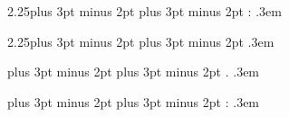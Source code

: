 {2.25\baselineskip plus 3pt minus 2pt}		%
{\baselineskip plus 3pt minus 2pt}		%
{\itshape}					%
{}						%
{\bfseries}					%
{:}						%
{.3em}						%
{\,}	%

{2.25\baselineskip plus 3pt minus 2pt}		%
{\baselineskip plus 3pt minus 2pt}		%
{\itshape}					%
{}						%
{\bfseries}					%
{}						%
{.3em}						%
{\,{\itshape{}}}	%

{\baselineskip plus 3pt minus 2pt}		%
{\baselineskip plus 3pt minus 2pt}		%
{}						%
{}						%
{\bfseries\itshape}				%
{.}						%
{.3em}						%
{}						%

{\baselineskip plus 3pt minus 2pt}		%
{\baselineskip plus 3pt minus 2pt}		%
{\itshape}					%
{}						%
{\bfseries}					%
{:}						%
{.3em}						%
{}						%

\theoremstyle{number-name}
  \newtheorem{lemma}{\color{lmm}Lema}[section]
  \newtheorem{theorem}{\color{thm}Teorema}[section]
  \newtheorem{proposition}{\color{prop}Proposição}[section]
  \newtheorem{corollary}{\color{crl}Corolário}[section]
  \newtheorem{definition}{\color{def}Definição}[section]

\makeatletter
	\let\c@theorem\c@lemma
	\let\c@proposition\c@lemma
	\let\c@corollary\c@lemma
	\let\c@definition\c@lemma
\makeatother

